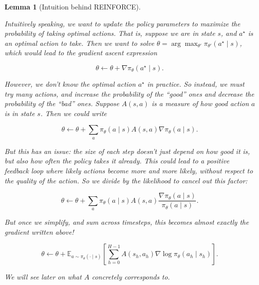 \documentclass[
  letterpaper,
  DIV=11,
  numbers=noendperiod]{scrreprt}
\theoremstyle{plain}
\newtheorem{lemma}{Lemma}[chapter]
\theoremstyle{plain}
\theoremstyle{definition}
\theoremstyle{definition}
\theoremstyle{remark}
\begin{document}
\begin{lemma}[Intuition behind
REINFORCE]\protect\hypertarget{lem-intuitive-remark}{}\label{lem-intuitive-remark}

Intuitively speaking, we want to update the policy parameters to
maximize the probability of taking \emph{optimal actions}. That is,
suppose we are in state \(s\), and \(a^\star\) is an optimal action to
take. Then we want to solve
\(\theta = \arg\max_{\theta'} \pi_{\theta'}(a^\star \mid s)\), which
would lead to the gradient ascent expression

\[
\theta \gets \theta + \nabla \pi_{\theta}(a^\star \mid s).
\]

However, we don't know the optimal action \(a^\star\) in practice. So
instead, we must try many actions, and \emph{increase} the probability
of the ``good'' ones and \emph{decrease} the probability of the ``bad''
ones. Suppose \(A(s, a)\) is a measure of how good action \(a\) is in
state \(s\). Then we could write

\[
\theta \gets \theta + \sum_a \pi_{\theta}(a \mid s) A(s, a) \nabla \pi_{\theta}(a \mid s).
\]

But this has an issue: the size of each step doesn't just depend on how
good it is, but also how \emph{often} the policy takes it already. This
could lead to a positive feedback loop where likely actions become more
and more likely, without respect to the quality of the action. So we
divide by the likelihood to cancel out this factor:

\[
\theta \gets \theta + \sum_a \pi_{\theta}(a \mid s) A(s, a) \frac{\nabla \pi_{\theta}(a \mid s)}{\pi_{\theta}(a \mid s)}.
\]

But once we simplify, and sum across timesteps, this becomes
\emph{almost} exactly the gradient written above!

\[
\theta \gets \theta + \mathbb{E}_{a \sim \pi_{\theta}(\cdot \mid s)} [\sum_{h=0}^{H-1} A(s_h, a_h) \nabla \log \pi_{\theta}(a_h\mid s_h) ].
\]

We will see later on what \(A\) concretely corresponds to.

\end{lemma}
\end{document}
